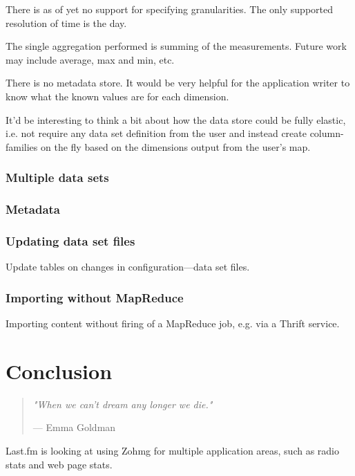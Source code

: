 \documentclass[a4paper,10pt]{book}
\newcommand{\chapterquote}[2] {
\begin{quote}
\textit{"{#1}"}

--- {#2}
\end{quote}

\vspace{24pt}
}
\begin{document}
There is as of yet no support for specifying granularities. The only supported resolution of time is the day.

The single aggregation performed is summing of the measurements. Future work may include average, max and min, etc.

There is no metadata store. It would be very helpful for the application writer to know what the known values are for each dimension.

It'd be interesting to think a bit about how the data store could be fully elastic, i.e. not require any data set definition from the user and instead create column-families on the fly based on the dimensions output from the user's map.

\subsection{Multiple data sets}

\subsection{Metadata}

\subsection{Updating data set files}

Update tables on changes in configuration---data set files.

\subsection{Importing without MapReduce}

Importing content without firing of a MapReduce job, e.g. via a Thrift
service.



\chapter{Conclusion}

\chapterquote{When we can't dream any longer we die.}{Emma Goldman}

Last.fm is looking at using Zohmg for multiple application areas, such as
radio stats and web page stats.


\pagebreak



 
\end{document}
